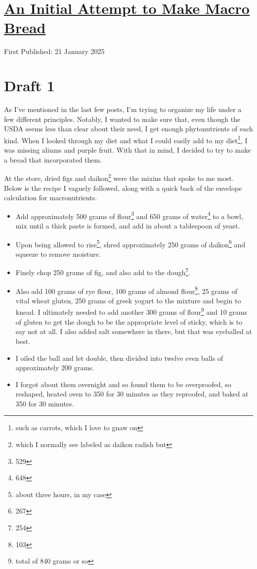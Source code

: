 \documentclass[12pt]{article}[titlepage]
\renewcommand{\,}{\textsuperscript{,}}
\begin{document}
\doublespacing
\section{\href{recipe-protein-bread-1.html}{An Initial Attempt to Make Macro Bread}}

First Published: 21 January 2025

\section{Draft 1}
As I've mentioned in the last few posts, I'm trying to organize my life under a few different principles.  
Notably, I wanted to make sure that, even though the USDA seems less than clear about their need, I get enough phytonutrients of each kind.  
When I looked through my diet and what I could easily add to my diet\footnote{such as carrots, which I love to gnaw on}, I was missing aliums and purple fruit.  
With that in mind, I decided to try to make a bread that incorporated them.

At the store, dried figs and daikon\footnote{which I normally see labeled as daikon radish but} were the mixins that spoke to me most.  
Below is the recipe I vaguely followed, along with a quick back of the envelope calculation for macronutrients.

\begin{itemize}  
\item Add approximately 500 grams of flour\footnote{529} and 650 grams of water\footnote{648} to a bowl, mix until a thick paste is formed, and add in about a tablespoon of yeast.  
\item Upon being allowed to rise\footnote{about three hours, in my case}, shred approximately 250 grams of daikon\footnote{267} and squeeze to remove moisture.  
\item Finely chop 250 grams of fig, and also add to the dough\footnote{254}.  
\item Also add 100 grams of rye flour, 100 grams of almond flour\footnote{103}, 25 grams of vital wheat gluten, 250 grams of greek yogurt to the mixture and begin to knead.  
I ultimately needed to add another 300 grams of flour\footnote{total of 840 grams or so} and 10 grams of gluten to get the dough to be the appropriate level of sticky, which is to say not at all. I also added salt somewhere in there, but that was eyeballed at best.  
\item I oiled the ball and let double, then divided into twelve even balls of approximately 200 grams.  
\item I forgot about them overnight and so found them to be overproofed, so reshaped, heated oven to 350 for 30 minutes as they reproofed, and baked at 350 for 30 minutes.  
\end{itemize}
\end{document}
